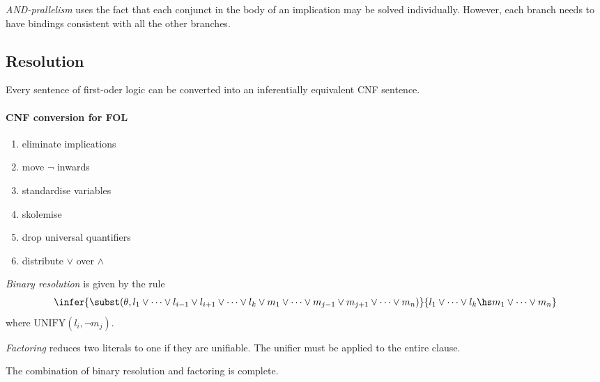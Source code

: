 \documentclass{article}
\begin{document}
\begin{definition}
    \emph{AND-prallelism} uses the fact that each conjunct in the body of an implication
    may be solved individually. However, each branch needs to have bindings consistent
    with all the other branches.
\end{definition}

\subsection{Resolution}

\begin{theorem}
    Every sentence of first-oder logic can be converted into an inferentially equivalent
    CNF sentence.
\end{theorem}

\paragraph{CNF conversion for FOL}
\begin{enumerate}
    \item eliminate implications
    \item move $\neg$ inwards
    \item standardise variables
    \item skolemise
    \item drop universal quantifiers
    \item distribute $\vee$ over $\wedge$
\end{enumerate}

\begin{definition}
    \emph{Binary resolution} is given by the rule
    \begin{align*}
        \infer{\subst(\theta,l_1\vee \cdots\vee l_{i-1}\vee l_{i+1}\vee\cdots\vee l_k\vee m_1\vee\cdots\vee m_{j-1}\vee m_{j+1}\vee \cdots\vee m_n)}{
            l_1\vee\cdots \vee l_k\hs m_1\vee\cdots\vee m_n
        } 
    \end{align*}
    where $\text{UNIFY}(l_i,\neg m_j)$.
\end{definition}

\begin{definition}
    \emph{Factoring} reduces two literals to one if they are unifiable. The unifier must be applied to the
    entire clause.
\end{definition}

\begin{theorem}
    The combination of binary resolution and factoring is complete.
\end{theorem}
\end{document}
